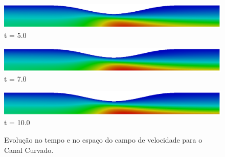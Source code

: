 \begin{figure}[H]
     \begin{minipage}{.50\linewidth}
      \centering
      \includegraphics[scale=0.175]{./02_chaps/cap_solution/figure/vel_Curved10000.png}\\
      t = 5.0
     \end{minipage}
     \begin{minipage}{.50\linewidth}
     \medskip
      \centering
      \includegraphics[scale=0.175]{./02_chaps/cap_solution/figure/vel_Curved14000.png}\\
      t = 7.0
     \end{minipage}%
     \begin{minipage}{.50\linewidth}
     \medskip
      \centering
      \includegraphics[scale=0.175]{./02_chaps/cap_solution/figure/vel_Curved20000.png}\\
      t = 10.0
     \end{minipage}
     \medskip
     \caption{Evolução no tempo e no espaço do campo de velocidade para o Canal Curvado.}
     \label{velocity field curved}
\end{figure}

\newpage
